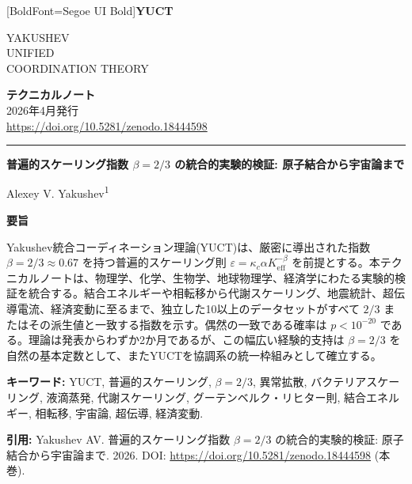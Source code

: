 \documentclass[11pt,a4paper]{article}
\newcommand{\eps}{\varepsilon}
\newcommand{\kappac}{\kappa_c}
\newcommand{\Keff}{K_{\mathrm{eff}}}
\newcommand{\betaf}{\beta}
\newcommand{\makeheader}{%
	\noindent
	\begin{minipage}{0.17\textwidth}
		\raggedright
		{\fontspec{Segoe UI}[BoldFont=Segoe UI Bold]\bfseries\color{skyblue}\fontsize{46}{46}\selectfont YUCT}%
	\end{minipage}%
	\hspace{30pt}
	\begin{minipage}{0.32\textwidth}
		\raggedright
		{\sffamily\fontsize{11}{13}\selectfont YAKUSHEV\\ UNIFIED\\ COORDINATION THEORY}%
	\end{minipage}%
	\hfill
	\begin{minipage}{0.38\textwidth}
		\raggedleft
		{\sffamily\bfseries テクニカルノート}\\
		{\sffamily 2026年4月発行}\\
		{\sffamily\footnotesize \url{https://doi.org/10.5281/zenodo.18444598}}%
	\end{minipage}
	\par\vspace{5pt}
	\noindent\textcolor{gold}{\rule{\textwidth}{1.6pt}}
	\par\vspace{0pt}
}
\begin{document}
	\thispagestyle{firstpage}
	\makeheader
	
	\vspace{0cm}
	{\LARGE\bfseries 普遍的スケーリング指数 \(\betaf = 2/3\) の統合的実験的検証: 原子結合から宇宙論まで \par}
	\vspace{0.2cm}
	
	{\large Alexey V. Yakushev\textsuperscript{1}} \\
	\vspace{0.0cm}
	
	{\color{darkblue}\textbf{\LARGE 要旨}} \par
	{\large
		\noindent
		Yakushev統合コーディネーション理論(YUCT)は、厳密に導出された指数 \(\betaf = 2/3 \approx 0.67\) を持つ普遍的スケーリング則 \(\eps = \kappac \alpha \Keff^{-\betaf}\) を前提とする。本テクニカルノートは、物理学、化学、生物学、地球物理学、経済学にわたる実験的検証を統合する。結合エネルギーや相転移から代謝スケーリング、地震統計、超伝導電流、経済変動に至るまで、独立した10以上のデータセットがすべて \(2/3\) またはその派生値と一致する指数を示す。偶然の一致である確率は \(p < 10^{-20}\) である。理論は発表からわずか2か月であるが、この幅広い経験的支持は \(\betaf = 2/3\) を自然の基本定数として、またYUCTを協調系の統一枠組みとして確立する。}
	
	\vspace{0.1cm}
	\noindent
	{\color{darkblue}\textbf{キーワード:}} YUCT, 普遍的スケーリング, \(\beta = 2/3\), 異常拡散, バクテリアスケーリング, 液滴蒸発, 代謝スケーリング, グーテンベルク・リヒター則, 結合エネルギー, 相転移, 宇宙論, 超伝導, 経済変動.
	
	\vspace{0.1cm}
	\noindent
	{\color{darkblue}\textbf{引用:}} Yakushev AV. 普遍的スケーリング指数 \(\beta = 2/3\) の統合的実験的検証: 原子結合から宇宙論まで. 2026. DOI: \url{https://doi.org/10.5281/zenodo.18444598} (本巻).
	
\end{document}
